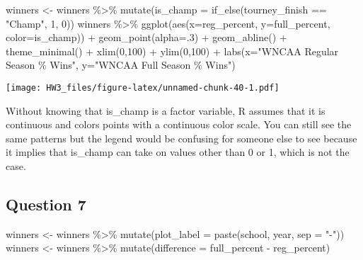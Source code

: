 \documentclass[
]{article}
\newenvironment{Shaded}{\begin{snugshade}}{\end{snugshade}}
\newcommand{\AttributeTok}[1]{\textcolor[rgb]{0.77,0.63,0.00}{#1}}
\newcommand{\DecValTok}[1]{\textcolor[rgb]{0.00,0.00,0.81}{#1}}
\newcommand{\FunctionTok}[1]{\textcolor[rgb]{0.00,0.00,0.00}{#1}}
\newcommand{\NormalTok}[1]{#1}
\newcommand{\OtherTok}[1]{\textcolor[rgb]{0.56,0.35,0.01}{#1}}
\newcommand{\SpecialCharTok}[1]{\textcolor[rgb]{0.00,0.00,0.00}{#1}}
\newcommand{\StringTok}[1]{\textcolor[rgb]{0.31,0.60,0.02}{#1}}
\begin{document}
\begin{Shaded}
\begin{Highlighting}[]
\NormalTok{winners }\OtherTok{\textless{}{-}}\NormalTok{ winners }\SpecialCharTok{\%\textgreater{}\%} 
  \FunctionTok{mutate}\NormalTok{(}\AttributeTok{is\_champ =} \FunctionTok{if\_else}\NormalTok{(tourney\_finish }\SpecialCharTok{==} \StringTok{"Champ"}\NormalTok{, }\DecValTok{1}\NormalTok{, }\DecValTok{0}\NormalTok{))}
\NormalTok{winners }\SpecialCharTok{\%\textgreater{}\%} \FunctionTok{ggplot}\NormalTok{(}\FunctionTok{aes}\NormalTok{(}\AttributeTok{x=}\NormalTok{reg\_percent,}
                   \AttributeTok{y=}\NormalTok{full\_percent,}
                   \AttributeTok{color=}\NormalTok{is\_champ)) }\SpecialCharTok{+}
  \FunctionTok{geom\_point}\NormalTok{(}\AttributeTok{alpha=}\NormalTok{.}\DecValTok{3}\NormalTok{) }\SpecialCharTok{+}
  \FunctionTok{geom\_abline}\NormalTok{() }\SpecialCharTok{+}
  \FunctionTok{theme\_minimal}\NormalTok{() }\SpecialCharTok{+}
  \FunctionTok{xlim}\NormalTok{(}\DecValTok{0}\NormalTok{,}\DecValTok{100}\NormalTok{) }\SpecialCharTok{+}
  \FunctionTok{ylim}\NormalTok{(}\DecValTok{0}\NormalTok{,}\DecValTok{100}\NormalTok{) }\SpecialCharTok{+} 
  \FunctionTok{labs}\NormalTok{(}\AttributeTok{x=}\StringTok{"WNCAA Regular Season \% Wins"}\NormalTok{, }
       \AttributeTok{y=}\StringTok{"WNCAA Full Season \% Wins"}\NormalTok{)}
\end{Highlighting}
\end{Shaded}

\texttt{[image: HW3\_files/figure-latex/unnamed-chunk-40-1.pdf]}

Without knowing that is\_champ is a factor variable, R assumes that it
is continuous and colors points with a continuous color scale. You can
still see the same patterns but the legend would be confusing for
someone else to see because it implies that is\_champ can take on values
other than 0 or 1, which is not the case.

\hypertarget{question-7-1}{%
\subsection{Question 7}\label{question-7-1}}

\begin{Shaded}
\begin{Highlighting}[]
\NormalTok{winners }\OtherTok{\textless{}{-}}\NormalTok{ winners }\SpecialCharTok{\%\textgreater{}\%} 
  \FunctionTok{mutate}\NormalTok{(}\AttributeTok{plot\_label =} \FunctionTok{paste}\NormalTok{(school, year, }\AttributeTok{sep =} \StringTok{"{-}"}\NormalTok{))}
\NormalTok{winners }\OtherTok{\textless{}{-}}\NormalTok{ winners }\SpecialCharTok{\%\textgreater{}\%} 
  \FunctionTok{mutate}\NormalTok{(}\AttributeTok{difference =}\NormalTok{ full\_percent }\SpecialCharTok{{-}}\NormalTok{ reg\_percent) }
\end{Highlighting}
\end{Shaded}
\end{document}
